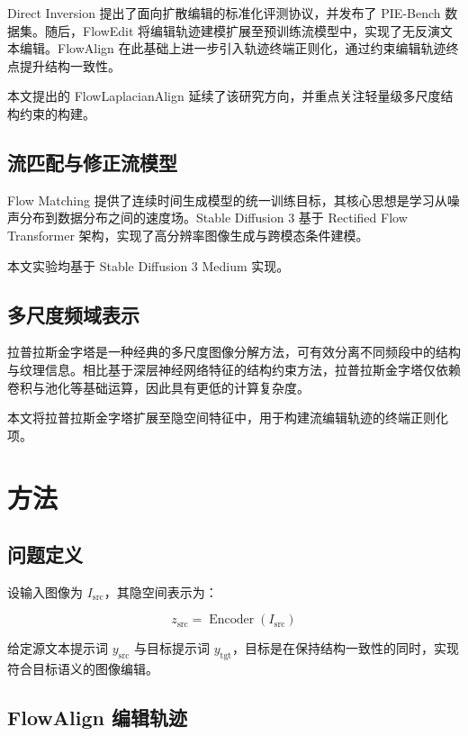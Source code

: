 \documentclass[11pt,a4paper]{ctexart}
\numberwithin{equation}{section}
\begin{document}
Direct Inversion 提出了面向扩散编辑的标准化评测协议，并发布了 PIE-Bench 数据集。随后，FlowEdit 将编辑轨迹建模扩展至预训练流模型中，实现了无反演文本编辑。FlowAlign 在此基础上进一步引入轨迹终端正则化，通过约束编辑轨迹终点提升结构一致性。

本文提出的 FlowLaplacianAlign 延续了该研究方向，并重点关注轻量级多尺度结构约束的构建。

\subsection{流匹配与修正流模型}

Flow Matching 提供了连续时间生成模型的统一训练目标，其核心思想是学习从噪声分布到数据分布之间的速度场。Stable Diffusion 3 基于 Rectified Flow Transformer 架构，实现了高分辨率图像生成与跨模态条件建模。

本文实验均基于 Stable Diffusion 3 Medium 实现。

\subsection{多尺度频域表示}

拉普拉斯金字塔是一种经典的多尺度图像分解方法，可有效分离不同频段中的结构与纹理信息。相比基于深层神经网络特征的结构约束方法，拉普拉斯金字塔仅依赖卷积与池化等基础运算，因此具有更低的计算复杂度。

本文将拉普拉斯金字塔扩展至隐空间特征中，用于构建流编辑轨迹的终端正则化项。

\section{方法}

\subsection{问题定义}

设输入图像为 $I_{\text{src}}$，其隐空间表示为：

\begin{equation}
z_{\text{src}} = \operatorname{Encoder}(I_{\text{src}})
\end{equation}

给定源文本提示词 $y_{\text{src}}$ 与目标提示词 $y_{\text{tgt}}$，目标是在保持结构一致性的同时，实现符合目标语义的图像编辑。

\subsection{FlowAlign 编辑轨迹}
\end{document}
